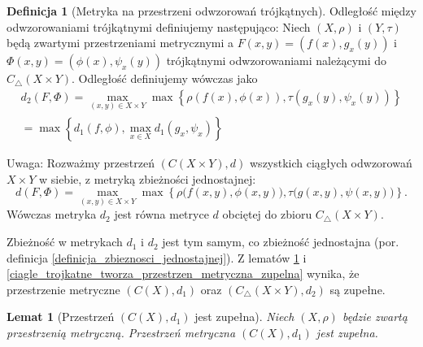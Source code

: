 \documentclass[licencjacka]{pwr_wmat_praca_dyplomowa}
\theoremstyle{plain}
\numberwithin{theorem}{chapter}
\newtheorem{lemma}[theorem]{Lemat}
\theoremstyle{definition}
\numberwithin{theorem}{chapter}
\newtheorem{definition}[theorem]{Definicja}
\begin{document}
\begin{definition}[Metryka na przestrzeni odwzorowań trójkątnych]
\label{definicja_metryki_d_dwa}
Odległość między odwzorowaniami trójkątnymi definiujemy następująco: Niech $(X, \rho)$ i $(Y, \tau)$ będą zwartymi przestrzeniami metrycznymi a $F(x,y) = (f(x), g_x(y))$ i $\Phi(x,y) = (\phi(x), \psi_x(y))$ trójkątnymi odwzorowaniami należącymi do $C_\triangle(X \times Y)$. Odległość definiujemy wówczas jako 
\begin{align*}
d_2(F, \Phi) = \max_{(x,y) \in X \times Y} \max\left\{\rho(f(x),\phi(x)), \tau(g_x(y), \psi_x(y))\right\} \\ 
= \max\left\{d_1(f,\phi), \max_{x \in X}d_1(g_x, \psi_x)\right\}
\end{align*}
\end{definition}

Uwaga: Rozważmy przestrzeń $(C(X \times Y), d)$ wszystkich ciągłych odwzorowań $X \times Y$ w siebie, z metryką zbieżności jednostajnej: 
$$d(F, \Phi) = \max_{(x,y) \in X \times Y} \max \left\{ \rho\big(f(x,y), \phi(x,y)\big), \tau\big(g(x,y), \psi(x,y)\big) \right\}.$$ 
Wówczas metryka $d_2$ jest równa metryce $d$ obciętej do zbioru $C_\triangle(X \times Y).$

Zbieżność w metrykach $d_1$ i $d_2$ jest tym samym, co zbieżność jednostajna (por. definicja \ref{definicja_zbieznosci_jednostajnej}).
Z lematów \ref{przestrzen_ciaglych_jest_zupelna} i \ref{ciagle_trojkatne_tworza_przestrzen_metryczna_zupelna} wynika, że przestrzenie metryczne $(C(X), d_1)$ oraz $(C_\triangle(X \times Y), d_2)$ są zupełne.


\begin{lemma}[Przestrzeń $(C(X), d_1)$ jest zupełna]\label{przestrzen_ciaglych_jest_zupelna}
Niech $(X, \rho)$ będzie zwartą przestrzenią metryczną. Przestrzeń metryczna $(C(X), d_1)$ jest zupełna.
\end{lemma}
\end{document}
